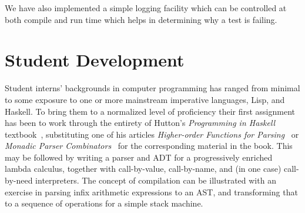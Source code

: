 \documentclass{llncs}
\begin{document}
We have also implemented a simple logging facility which can be controlled at 
both compile and run time which helps in determining why a test is failing.

\section{Student Development}

Student interns' backgrounds in computer programming has ranged from minimal
to some exposure to one or more mainstream imperative languages, Lisp, and
Haskell.  To bring them to a normalized level of proficiency their first
assignment has been to work through the entirety of Hutton's \emph{Programming
  in Haskell} textbook~\cite{Hutton-book}, substituting one of his articles
\emph{Higher-order Functions for Parsing}~\cite{Hutton-parsing:1992} or
\emph{Monadic Parser Combinators}~\cite{Hutton:1996} for the corresponding
material in the book.  This may be followed by writing a parser and ADT for a
progressively enriched lambda calculus, together with call-by-value,
call-by-name, and (in one case) call-by-need interpreters.  The concept of
compilation can be illustrated with an exercise in parsing infix arithmetic
expressions to an AST, and transforming that to a sequence of operations for a
simple stack machine.


%
%




\end{document}
